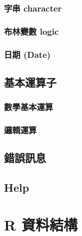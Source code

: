\documentclass[]{book}
\begin{document}
\hypertarget{ux5b57ux4e32-character}{%
\subsection{字串 character}\label{ux5b57ux4e32-character}}

\hypertarget{ux5e03ux6797ux8b8aux6578-logic}{%
\subsection{布林變數 logic}\label{ux5e03ux6797ux8b8aux6578-logic}}

\hypertarget{ux65e5ux671f-date}{%
\subsection{日期 (Date)}\label{ux65e5ux671f-date}}

\hypertarget{ux57faux672cux904bux7b97ux5b50}{%
\section{基本運算子}\label{ux57faux672cux904bux7b97ux5b50}}

\hypertarget{ux6578ux5b78ux57faux672cux904bux7b97}{%
\subsection{數學基本運算}\label{ux6578ux5b78ux57faux672cux904bux7b97}}

\hypertarget{ux908fux8f2fux904bux7b97}{%
\subsection{邏輯運算}\label{ux908fux8f2fux904bux7b97}}

\hypertarget{ux932fux8aa4ux8a0aux606f}{%
\section{錯誤訊息}\label{ux932fux8aa4ux8a0aux606f}}

\hypertarget{help}{%
\section{Help}\label{help}}

\hypertarget{RDataStructure}{%
\chapter{R 資料結構}\label{RDataStructure}}
\end{document}

